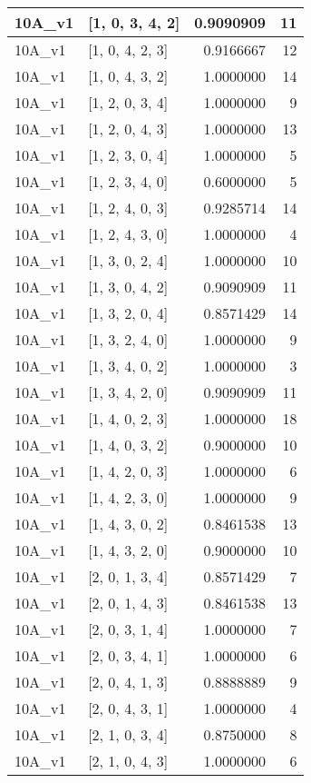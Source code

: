 \documentclass[]{book}
\theoremstyle{definition}
\theoremstyle{definition}
\theoremstyle{definition}
\theoremstyle{remark}
\begin{document}
\begin{tabular}{l|l|r|r}
\hline
10A\_v1 & [1, 0, 3, 4, 2] & 0.9090909 & 11\\
\hline
10A\_v1 & [1, 0, 4, 2, 3] & 0.9166667 & 12\\
\hline
10A\_v1 & [1, 0, 4, 3, 2] & 1.0000000 & 14\\
\hline
10A\_v1 & [1, 2, 0, 3, 4] & 1.0000000 & 9\\
\hline
10A\_v1 & [1, 2, 0, 4, 3] & 1.0000000 & 13\\
\hline
10A\_v1 & [1, 2, 3, 0, 4] & 1.0000000 & 5\\
\hline
10A\_v1 & [1, 2, 3, 4, 0] & 0.6000000 & 5\\
\hline
10A\_v1 & [1, 2, 4, 0, 3] & 0.9285714 & 14\\
\hline
10A\_v1 & [1, 2, 4, 3, 0] & 1.0000000 & 4\\
\hline
10A\_v1 & [1, 3, 0, 2, 4] & 1.0000000 & 10\\
\hline
10A\_v1 & [1, 3, 0, 4, 2] & 0.9090909 & 11\\
\hline
10A\_v1 & [1, 3, 2, 0, 4] & 0.8571429 & 14\\
\hline
10A\_v1 & [1, 3, 2, 4, 0] & 1.0000000 & 9\\
\hline
10A\_v1 & [1, 3, 4, 0, 2] & 1.0000000 & 3\\
\hline
10A\_v1 & [1, 3, 4, 2, 0] & 0.9090909 & 11\\
\hline
10A\_v1 & [1, 4, 0, 2, 3] & 1.0000000 & 18\\
\hline
10A\_v1 & [1, 4, 0, 3, 2] & 0.9000000 & 10\\
\hline
10A\_v1 & [1, 4, 2, 0, 3] & 1.0000000 & 6\\
\hline
10A\_v1 & [1, 4, 2, 3, 0] & 1.0000000 & 9\\
\hline
10A\_v1 & [1, 4, 3, 0, 2] & 0.8461538 & 13\\
\hline
10A\_v1 & [1, 4, 3, 2, 0] & 0.9000000 & 10\\
\hline
10A\_v1 & [2, 0, 1, 3, 4] & 0.8571429 & 7\\
\hline
10A\_v1 & [2, 0, 1, 4, 3] & 0.8461538 & 13\\
\hline
10A\_v1 & [2, 0, 3, 1, 4] & 1.0000000 & 7\\
\hline
10A\_v1 & [2, 0, 3, 4, 1] & 1.0000000 & 6\\
\hline
10A\_v1 & [2, 0, 4, 1, 3] & 0.8888889 & 9\\
\hline
10A\_v1 & [2, 0, 4, 3, 1] & 1.0000000 & 4\\
\hline
10A\_v1 & [2, 1, 0, 3, 4] & 0.8750000 & 8\\
\hline
10A\_v1 & [2, 1, 0, 4, 3] & 1.0000000 & 6\\

\end{tabular}
\end{document}
